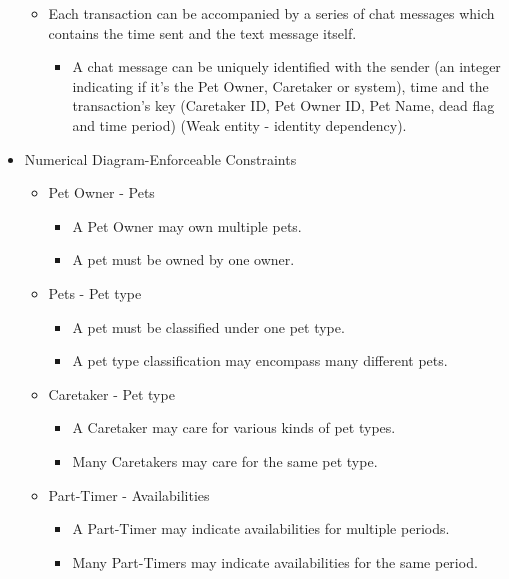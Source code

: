 \documentclass[10pt]{article}
\begin{document}
\begin{itemize}
\begin{itemize}
\begin{itemize}
        \end{itemize}
        \item Each transaction can be accompanied by a series of chat messages which contains the time sent and the text message itself.
        \begin{itemize}
            \item A chat message can be uniquely identified with the sender (an integer indicating if it's the Pet Owner, Caretaker or system), time and the transaction's key (Caretaker ID, Pet Owner ID, Pet Name, dead flag and time period) (Weak entity - identity dependency).
        \end{itemize}
    \end{itemize}
    
    \item Numerical Diagram-Enforceable Constraints
    \begin{itemize}
        \item Pet Owner - Pets
        \begin{itemize}
            \item A Pet Owner may own multiple pets.
            \item A pet must be owned by one owner.
        \end{itemize}
        \item Pets - Pet type
        \begin{itemize}
            \item A pet must be classified under one pet type.
            \item A pet type classification may encompass many different pets.
        \end{itemize}
        \item Caretaker - Pet type
        \begin{itemize}
            \item A Caretaker may care for various kinds of pet types.
            \item Many Caretakers may care for the same pet type.
        \end{itemize}
        \item Part-Timer - Availabilities
        \begin{itemize}
            \item A Part-Timer may indicate availabilities for multiple periods.
            \item Many Part-Timers may indicate availabilities for the same period.
	    \end{itemize}

\end{itemize}
\end{itemize}
\end{document}
